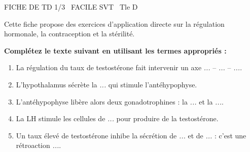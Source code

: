 \documentclass[11pt]{article}
\begin{document}
\begin{tcolorbox}[enhanced,colback=popink,colframe=popink,arc=10pt,boxrule=0pt,left=12pt,right=12pt,top=9pt,bottom=9pt]
{\color{white}\popxbold\small FICHE DE TD 1/3 \textbullet\ FACILE \hfill SVT \textbullet\ Tle D\par}
\end{tcolorbox}
\vspace{4pt}
Cette fiche propose des exercices d'application directe sur la régulation hormonale, la contraception et la stérilité.

\begin{exercice}
\textbf{Complétez le texte suivant en utilisant les termes appropriés :}
\begin{enumerate}
    \item La régulation du taux de testostérone fait intervenir un axe \textit{...} -- \textit{...} -- \textit{...}.
    \item L'hypothalamus sécrète la \textit{...} qui stimule l'antéhypophyse.
    \item L'antéhypophyse libère alors deux gonadotrophines : la \textit{...} et la \textit{...}.
    \item La LH stimule les cellules de \textit{...} pour produire de la testostérone.
    \item Un taux élevé de testostérone inhibe la sécrétion de \textit{...} et de \textit{...} : c'est une rétroaction \textit{...}.
\end{enumerate}
\end{exercice}
\end{document}
